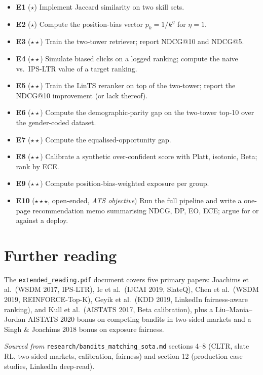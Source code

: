 \documentclass[11pt,oneside]{scrbook}
\begin{document}
\begin{itemize}\setlength\itemsep{2pt}
  \item \textbf{E1} ($\star$) Implement Jaccard similarity on two skill sets.
  \item \textbf{E2} ($\star$) Compute the position-bias vector $p_k = 1/k^\eta$ for $\eta = 1$.
  \item \textbf{E3} ($\star\star$) Train the two-tower retriever; report
        NDCG@10 and NDCG@5.
  \item \textbf{E4} ($\star\star$) Simulate biased clicks on a logged ranking;
        compute the naive vs.\ IPS-LTR value of a target ranking.
  \item \textbf{E5} ($\star\star$) Train the LinTS reranker on top of the
        two-tower; report the NDCG@10 improvement (or lack thereof).
  \item \textbf{E6} ($\star\star$) Compute the demographic-parity gap on the
        two-tower top-10 over the gender-coded dataset.
  \item \textbf{E7} ($\star\star$) Compute the equalised-opportunity gap.
  \item \textbf{E8} ($\star\star$) Calibrate a synthetic over-confident
        score with Platt, isotonic, Beta; rank by ECE.
  \item \textbf{E9} ($\star\star$) Compute position-bias-weighted exposure
        per group.
  \item \textbf{E10} ($\star\star\star$, open-ended, \emph{ATS objective}) Run the full pipeline
        and write a one-page recommendation memo summarising NDCG, DP, EO,
        ECE; argue for or against a deploy.
\end{itemize}

\chapter{Further reading}

The \texttt{extended\_reading.pdf} document covers five primary papers:
Joachims et al.\ (WSDM 2017, IPS-LTR), Ie et al.\ (IJCAI 2019, SlateQ),
Chen et al.\ (WSDM 2019, REINFORCE-Top-K), Geyik et al.\ (KDD 2019,
LinkedIn fairness-aware ranking), and Kull et al.\ (AISTATS 2017, Beta
calibration), plus a Liu--Mania--Jordan AISTATS 2020 bonus on competing
bandits in two-sided markets and a Singh \& Joachims 2018 bonus on
exposure fairness.

\emph{Sourced from} \texttt{research/bandits\_matching\_sota.md} sections
4--8 (CLTR, slate RL, two-sided markets, calibration, fairness) and section
12 (production case studies, LinkedIn deep-read).
\end{document}

